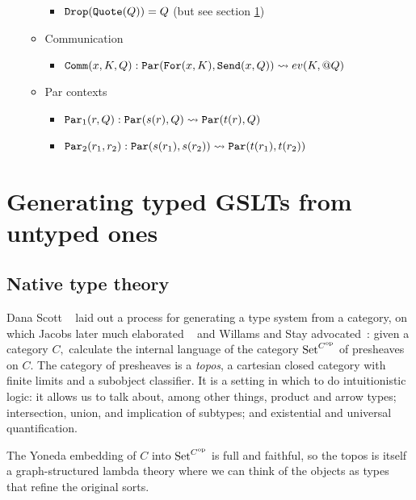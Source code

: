 \documentclass{article}
\begin{document}
\begin{itemize}
\begin{itemize}
\begin{itemize}
                \item ${\tt Drop}({\tt Quote}(Q)) = Q$ (but see section \ref{TypedGSLTs})
            \end{itemize}
        \item Communication
            \begin{itemize}
                \item ${\tt Comm}(x, K, Q) : {\tt Par}({\tt For}(x, K), {\tt Send}(x, Q)) \leadsto ev(K, @Q)$
            \end{itemize}
        \item Par contexts
            \begin{itemize}
                \item ${\tt Par}_1(r, Q) : {\tt Par}(s(r), Q) \leadsto {\tt Par}(t(r), Q)$
                \item ${\tt Par}_2(r_1, r_2) : {\tt Par}(s(r_1), s(r_2)) \leadsto {\tt Par}(t(r_1), t(r_2))$
            \end{itemize}
    \end{itemize}
\end{itemize}

\section{Generating typed GSLTs from untyped ones}
\label{TypedGSLTs}

\subsection{Native type theory}
Dana Scott ~\cite{Scott1980} laid out a process for generating a type system from a category, on which Jacobs later much elaborated ~\cite{Jacobs1999} and Willams and Stay advocated~\cite{WilliamsStay2021}:
given a category $C,$ calculate the internal language of the category ${\rm Set}^{C^{\rm op}}$ of presheaves on $C.$  The category of presheaves is a {\em topos}, a cartesian closed category with finite limits and a subobject classifier.  It is a setting in which to do intuitionistic logic: it allows us to talk about, among other things, product and arrow types; intersection, union, and implication of subtypes; and existential and universal quantification.  

The Yoneda embedding of $C$ into ${\rm Set}^{C^{\rm op}}$ is full and faithful, so the topos is itself a graph-structured lambda theory where we can think of the objects as types that refine the original sorts.
\end{document}
